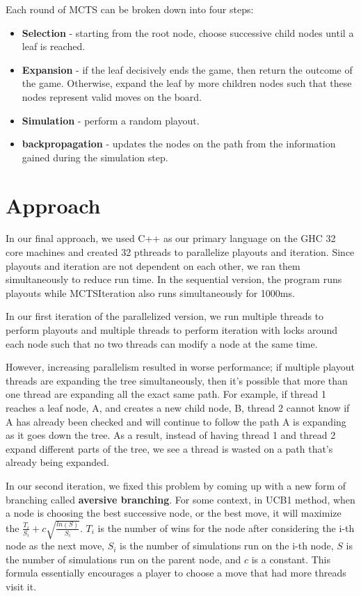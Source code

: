 \documentclass[11pt]{article}
\begin{document}
Each round of MCTS can be broken down into four steps:

\begin{itemize}
\item \textbf{Selection} - starting from the root node, choose successive child nodes until a leaf is reached.
\item \textbf{Expansion} - if the leaf decisively ends the game, then return the outcome of the game. Otherwise, expand the leaf by more children nodes such that these nodes represent valid moves on the board.
\item \textbf{Simulation} - perform a random playout. 
\item \textbf{backpropagation} - updates the nodes on the path from the information gained during the simulation step.
\end{itemize}
\section*{Approach}

In our final approach, we used C++ as our primary language on the GHC 32 core machines and created 32 pthreads to parallelize playouts and iteration. Since playouts and iteration are not dependent on each other, we ran them simultaneously to reduce run time. In the sequential version, the program runs playouts while MCTSIteration also runs simultaneously for 1000ms. 

In our first iteration of the parallelized version, we run multiple threads to perform playouts and multiple threads to perform iteration with locks around each node such that no two threads can modify a node at the same time. 

However, increasing parallelism resulted in worse performance; if multiple playout threads are expanding the tree simultaneously, then it's possible that more than one thread are expanding all the exact same path. For example, if thread 1 reaches a leaf node, A, and creates a new child node, B, thread 2 cannot know if A has already been checked and will continue to follow the path A is expanding as it goes down the tree. As a result, instead of having thread 1 and thread 2 expand different parts of the tree, we see a thread is wasted on a path that's already being expanded. 

In our second iteration, we fixed this problem by coming up with a new form of branching called \textbf{aversive branching}. For some context, in UCB1 method, when a node is choosing the best successive node, or the best move, it will maximize the $\frac{T_i}{S_i} + c\sqrt{\frac{ln(S)}{S_i}}$. $T_i$ is the number of wins for the node after considering the i-th node as the next move, $S_i$ is the number of simulations run on the i-th node, $S$ is the number of simulations run on the parent node, and $c$ is a constant. This formula essentially encourages a player to choose a move that had more threads visit it. 
\end{document}
